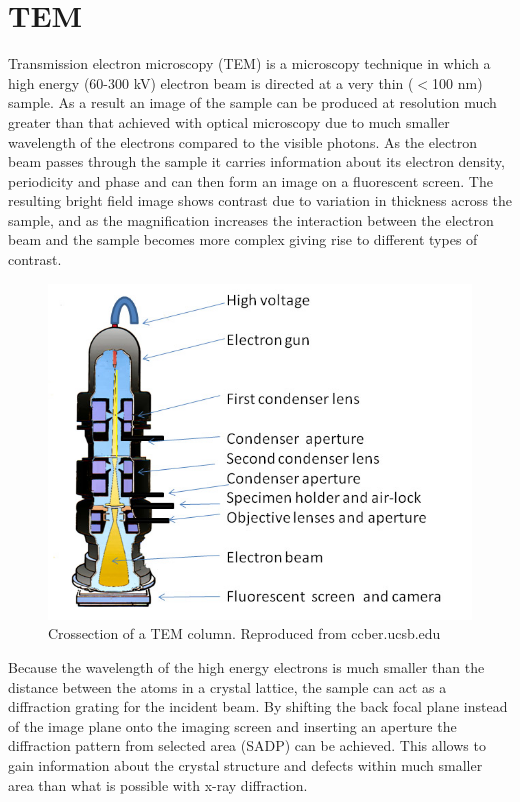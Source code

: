 \section{TEM}

Transmission electron microscopy (TEM) is a microscopy technique in which a high energy (60-300 kV) electron beam is directed at a very thin ($<$100 nm) sample. As a result an image of the sample can be produced at resolution much greater than that achieved with optical microscopy due to much smaller wavelength of the electrons compared to the visible photons. As the electron beam passes through the sample it carries information about its electron density, periodicity and phase and can then form an image on a fluorescent screen. The resulting bright field image shows contrast due to variation in thickness across the sample, and as the magnification increases the interaction between the electron beam and the sample becomes more complex giving rise to different types of contrast. 

\begin{figure}[!h]
	\begin{center}
		\includegraphics[scale=0.3]{Methodology/TEMSetup.png}
		\caption{Crossection of a TEM column. Reproduced from ccber.ucsb.edu}
		\label{fig:MethodologyTEMSetup}
	\end{center}
\end{figure}

Because the wavelength of the high energy electrons is much smaller than the distance between the atoms in a crystal lattice, the sample can act as a diffraction grating for the incident beam. By shifting the back focal plane instead of the image plane onto the imaging screen and inserting an aperture the diffraction pattern from selected area (SADP) can be achieved. This allows to gain information about the crystal structure and defects within much smaller area than what is possible with x-ray diffraction.

